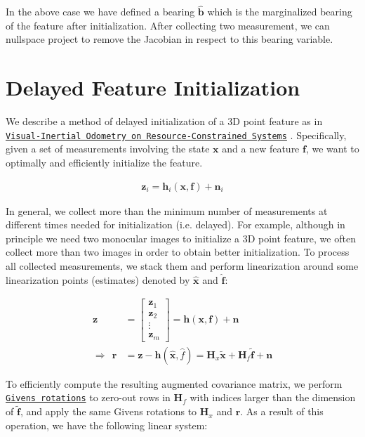 In the above case we have defined a bearing $\hat{\mathbf{b}}$ which is the marginalized bearing of the feature after initialization. After collecting two measurement, we can nullspace project to remove the Jacobian in respect to this bearing variable. \hypertarget{update-delay}{}\section{Delayed Feature Initialization}\label{update-delay}
We describe a method of delayed initialization of a 3D point feature as in \href{https://escholarship.org/content/qt4nn0j264/qt4nn0j264.pdf}{\tt Visual-\/\+Inertial Odometry on Resource-\/\+Constrained Systems} \cite{Li2014THESIS}. Specifically, given a set of measurements involving the state $\mathbf{x}$ and a new feature $\mathbf{f}$, we want to optimally and efficiently initialize the feature.

\begin{align*} \mathbf{z}_i = \mathbf{h}_i\left(\mathbf{x}, \mathbf{f}\right) + \mathbf{n}_i \end{align*}

In general, we collect more than the minimum number of measurements at different times needed for initialization (i.\+e. delayed). For example, although in principle we need two monocular images to initialize a 3D point feature, we often collect more than two images in order to obtain better initialization. To process all collected measurements, we stack them and perform linearization around some linearization points (estimates) denoted by $\hat{\mathbf x}$ and $\hat{\mathbf f}$\+:

\begin{align*} \mathbf{z} &= \begin{bmatrix} \mathbf{z}_1 \\ \mathbf{z}_2 \\ \vdots \\ \mathbf{z}_m \end{bmatrix} = \mathbf{h}\left(\mathbf{x}, \mathbf{f}\right)+ \mathbf{n}\\ \Rightarrow~~ \mathbf{r} &= \mathbf{z}-\mathbf{h}(\hat{\mathbf{x}}, \hat{f}) = \mathbf{H}_x \tilde{\mathbf{x}} +\mathbf{H}_f \tilde{\mathbf{f}} + \mathbf{n} \end{align*}

To efficiently compute the resulting augmented covariance matrix, we perform \href{https://en.wikipedia.org/wiki/Givens_rotation}{\tt Givens rotations} to zero-\/out rows in $\mathbf{H}_f$ with indices larger than the dimension of $\tilde{\mathbf{f}}$, and apply the same Givens rotations to $\mathbf{H}_x$ and $\mathbf{r}$. As a result of this operation, we have the following linear system\+:

